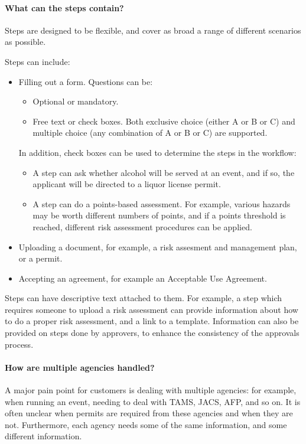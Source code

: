 \documentclass[12pt,a4paper,twosided]{article}
\begin{document}
\paragraph{What can the steps contain?}

Steps are designed to be flexible, and cover as broad a range of different scenarios as possible.

Steps can include:
\begin{itemize}
\item Filling out a form. Questions can be:
  \begin{itemize}
  \item Optional or mandatory.
  \item Free text or check boxes. Both exclusive choice (either A or B or C) and multiple choice (any combination of A or B or C) are supported. 
  \end{itemize}

  In addition, check boxes can be used to determine the steps in the workflow:
  \begin{itemize}
  \item A step can ask whether alcohol will be served at an event, and if so, the applicant will be directed to a liquor license permit.
  \item A step can do a points-based assessment. For example, various hazards may be worth different numbers of points, and if a points threshold is reached, different risk assessment procedures can be applied.
  \end{itemize}
\item Uploading a document, for example, a risk assesment and management plan, or a permit.
\item Accepting an agreement, for example an Acceptable Use Agreement.
\end{itemize}

Steps can have descriptive text attached to them. For example, a step which requires someone to upload a risk assessment can provide information about how to do a proper risk assessment, and a link to a template. Information can also be provided on steps done by approvers, to enhance the consistency of the approvals process.

\paragraph{How are multiple agencies handled?}

A major pain point for customers is dealing with multiple agencies: for example, when running an event, needing to deal with TAMS, JACS, AFP, and so on. It is often unclear when permits are required from these agencies and when they are not. Furthermore, each agency needs some of the same information, and some different information. 
\end{document}

